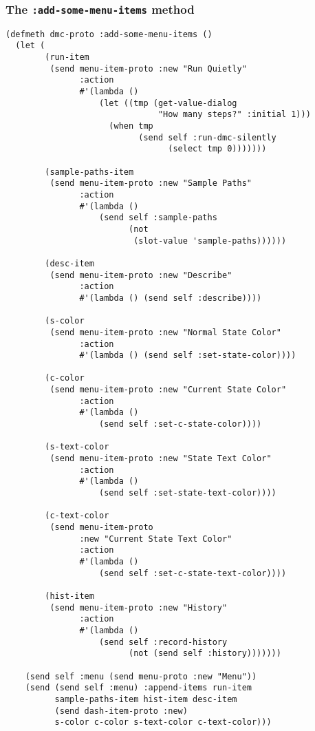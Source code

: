 \subsubsection{The {\tt :add-some-menu-items} method}
\label{subsubsec:add-some-menu-items}
\begin{verbatim}
(defmeth dmc-proto :add-some-menu-items ()
  (let (
        (run-item 
         (send menu-item-proto :new "Run Quietly"
               :action 
               #'(lambda ()
                   (let ((tmp (get-value-dialog
                               "How many steps?" :initial 1)))
                     (when tmp
                           (send self :run-dmc-silently 
                                 (select tmp 0)))))))

        (sample-paths-item 
         (send menu-item-proto :new "Sample Paths"
               :action 
               #'(lambda ()
                   (send self :sample-paths
                         (not 
                          (slot-value 'sample-paths))))))

        (desc-item 
         (send menu-item-proto :new "Describe"
               :action
               #'(lambda () (send self :describe))))
        
        (s-color 
         (send menu-item-proto :new "Normal State Color"
               :action
               #'(lambda () (send self :set-state-color))))

        (c-color 
         (send menu-item-proto :new "Current State Color" 
               :action 
               #'(lambda () 
                   (send self :set-c-state-color))))
        
        (s-text-color 
         (send menu-item-proto :new "State Text Color"
               :action 
               #'(lambda ()
                   (send self :set-state-text-color))))

        (c-text-color 
         (send menu-item-proto 
               :new "Current State Text Color"
               :action 
               #'(lambda ()
                   (send self :set-c-state-text-color))))

        (hist-item 
         (send menu-item-proto :new "History"
               :action 
               #'(lambda ()
                   (send self :record-history
                         (not (send self :history)))))))

    (send self :menu (send menu-proto :new "Menu"))
    (send (send self :menu) :append-items run-item 
          sample-paths-item hist-item desc-item 
          (send dash-item-proto :new)
          s-color c-color s-text-color c-text-color)))
\end{verbatim}

